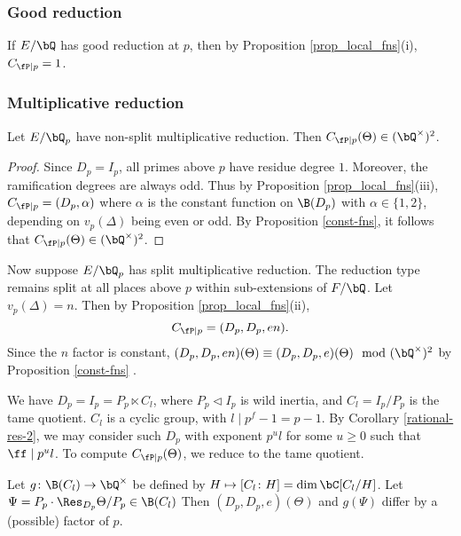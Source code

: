 \subsubsection*{Good reduction}
If $E / \bQ$ has good reduction at $p$, then by Proposition \ref{prop_local_fns}(i), $C_{\fP \mid p} = 1$.

\subsubsection*{Multiplicative reduction}

\begin{lemma}
Let $E / \bQ_p$ have non-split multiplicative reduction. Then $C_{\fP \mid p}(\Theta) \in (\bQ^{\times})^2$.
\end{lemma}

\begin{proof}
Since $D_p = I_p$, all primes above $p$ have residue degree $1$. Moreover, the ramification degrees are always odd. Thus by Proposition \ref{prop_local_fns}(iii), $C_{\fP \mid p}  = (D_p, \alpha)$
where $\alpha$ is the constant function on $\B(D_p)$ with $\alpha \in \{1, 2\}$, depending on $v_p(\Delta)$ being even or odd. By Proposition \ref{const-fns}, it follows that $C_{\fP \mid p}(\Theta) \in (\bQ^{\times})^2$.
\end{proof}

Now suppose $E / \bQ_p$ has split multiplicative reduction. The reduction type remains split at all places above $p$ within sub-extensions of $F / \bQ$. Let $v_p(\Delta) = n$. Then by Proposition \ref{prop_local_fns}(ii), 
\[ C_{\fP \mid p} = (D_p, D_p, en). \]
Since the $n$ factor is constant, $(D_p, D_p, en)(\Theta) \equiv (D_p, D_p, e)(\Theta) \mod (\bQ^{\times}) ^2$ by Proposition \ref{const-fns} .

We have $D_p = I_p = P_p \ltimes C_l$, where $P_p \triangleleft I_p$ is wild inertia, and $C_l = I_p / P_p$ is the tame quotient. $C_l$ is a cyclic group, with $l \mid p^f - 1 = p - 1$. By Corollary \ref{rational-res-2}, we may consider such $D_p$ with exponent  $p^u l$ for some $u \geq 0$ such that $\ff \mid p^u l$. To compute $C_{\fP \mid p}(\Theta)$, we reduce to the tame quotient.

\begin{lemma}
Let $g \colon \B(C_l) \to \bQ^{\times}$ be defined by $H \mapsto [C_l \colon H] = \dim \bC[C_l / H]$. Let $\Psi = P_p \cdot \Res_{D_p} \Theta / P_p \in \B(C_l)$ Then $(D_p, D_p, e)(\Theta)$ and $g(\Psi)$ differ by a (possible) factor of $p$. 
\end{lemma}

